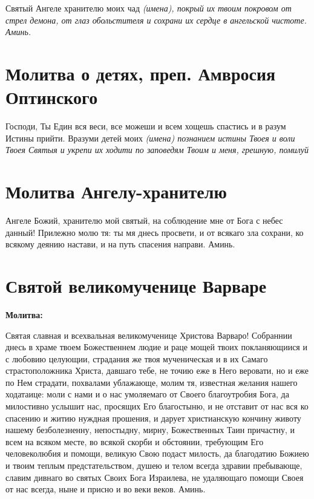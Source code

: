 Святый Ангеле хранителю моих чад \itshape (имена)\normalfont{}, покрый их твоим покровом от стрел демона, от глаз обольстителя и сохрани их сердце в ангельской чистоте. Аминь. 





\section{Молитва о детях, преп. Амвросия Оптинского}
 


Господи, Ты Един вся веси, все можеши и всем хощешь спастись и в разум Истины прийти. Вразуми детей моих \itshape (имена)\normalfont{} познанием истины Твоея и воли Твоея Святыя и укрепи их ходити по заповедям Твоим и меня, грешную, помилуй


\section{Молитва Ангелу-хранителю}
 


Ангеле Божий, хранителю мой святый, на соблюдение мне от Бога с небес данный! Прилежно молю тя: ты мя днесь просвети, и от всякаго зла сохрани, ко всякому деянию настави, и на путь спасения направи. Аминь.


\section{Святой великомученице Варваре}
 
\bfseries Молитва:\normalfont{}


Святая славная и всехвальная великомученице Христова Варваро! Собраннии днесь в храме твоем Божественнем людие и раце мощей твоих покланяющиися и с любовию целующии, страдания же твоя мученическая и в их Самаго страстоположника Христа, давшаго тебе, не точию еже в Него веровати, но и еже по Нем страдати, похвалами ублажающе, молим тя, известная желания нашего ходатаице: моли с нами и о нас умоляемаго от Своего благоутробия Бога, да милостивно услышит нас, просящих Его благостыню, и не отставит от нас вся ко спасению и житию нуждная прошения, и дарует христианскую кончину животу нашему безболезненну, непостыдну, мирну, Божественных Таин причастну, и всем на всяком месте, во всякой скорби и обстоянии, требующим Его человеколюбия и помощи, великую Свою подаст милость, да благодатию Божиею и твоим теплым предстательством, душею и телом всегда здравии пребывающе, славим дивнаго во святых Своих Бога Израилева, не удаляющаго помощи Своея от нас всегда, ныне и присно и во веки веков. Аминь.

